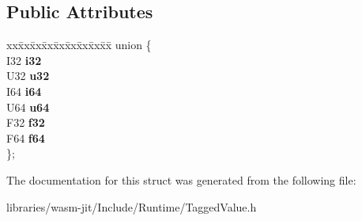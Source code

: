 \subsection*{Public Attributes}
\begin{DoxyCompactItemize}
\item 
\mbox{\label{struct_runtime_1_1_untagged_value_afe184f2e7f7e33a59cb8df51886455a8}} 
\begin{tabbing}
xx\=xx\=xx\=xx\=xx\=xx\=xx\=xx\=xx\=\kill
union \{\\
\>I32 {\bfseries i32}\\
\>U32 {\bfseries u32}\\
\>I64 {\bfseries i64}\\
\>U64 {\bfseries u64}\\
\>F32 {\bfseries f32}\\
\>F64 {\bfseries f64}\\
\}; \\

\end{tabbing}\end{DoxyCompactItemize}


The documentation for this struct was generated from the following file\+:\begin{DoxyCompactItemize}
\item 
libraries/wasm-\/jit/\+Include/\+Runtime/Tagged\+Value.\+h\end{DoxyCompactItemize}
